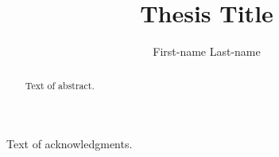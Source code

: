 
\author{First-name Last-name}
\title{Thesis Title}
\cosupervisor                   %




\begin{abstract}
  Text of abstract.  
\end{abstract}

\begin{acknowledgments}
  Text of acknowledgments.
\end{acknowledgments}




